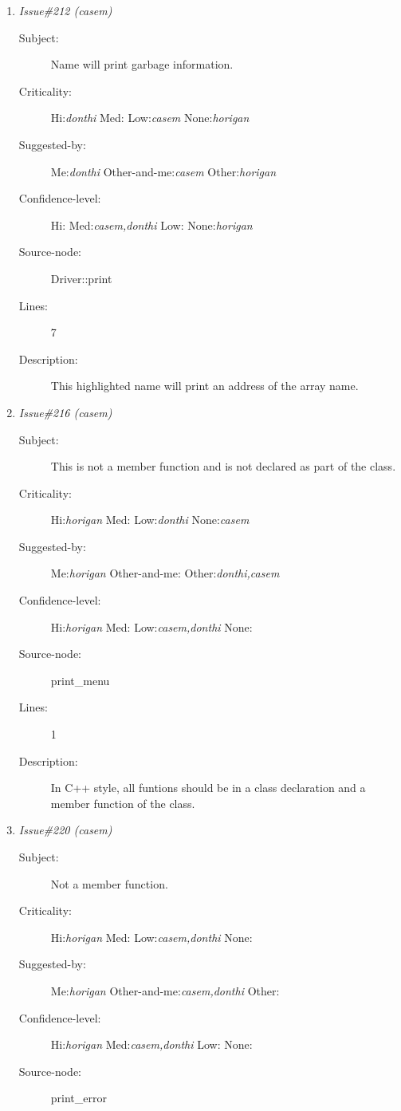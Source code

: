 \begin{enumerate}
\begin{description}
\item [Lines:] 3-4

\item [Description:] This has no code that would deallocate memory
that was allocated in the constructor.  Serious potential for a memory leak.
\end{description}
\item {\it Issue\#212 (casem)}
\begin{description}
\item [Subject:] Name will print garbage information.
\item [Criticality:] Hi:{\it donthi} Med:{\it } Low:{\it casem} None:{\it horigan}
\item [Suggested-by:] Me:{\it donthi} Other-and-me:{\it casem} Other:{\it horigan}
\item [Confidence-level:] Hi:{\it } Med:{\it casem,donthi} Low:{\it } None:{\it horigan}
\item [Source-node:] Driver::print

\item [Lines:] 7

\item [Description:] This highlighted name will print an address
of the array name.
\end{description}
\item {\it Issue\#216 (casem)}
\begin{description}
\item [Subject:] This is not a member function and is not declared
         as part of the class.
\item [Criticality:] Hi:{\it horigan} Med:{\it } Low:{\it donthi} None:{\it casem}
\item [Suggested-by:] Me:{\it horigan} Other-and-me:{\it } Other:{\it donthi,casem}
\item [Confidence-level:] Hi:{\it horigan} Med:{\it } Low:{\it casem,donthi} None:{\it }
\item [Source-node:] print\_menu

\item [Lines:] 1

\item [Description:] In C++ style, all funtions should be in a 
class declaration and a member function of the class.
\end{description}
\item {\it Issue\#220 (casem)}
\begin{description}
\item [Subject:] Not a member function.
\item [Criticality:] Hi:{\it horigan} Med:{\it } Low:{\it casem,donthi} None:{\it }
\item [Suggested-by:] Me:{\it horigan} Other-and-me:{\it casem,donthi} Other:{\it }
\item [Confidence-level:] Hi:{\it horigan} Med:{\it casem,donthi} Low:{\it } None:{\it }
\item [Source-node:] print\_error


\end{description}
\end{enumerate}

